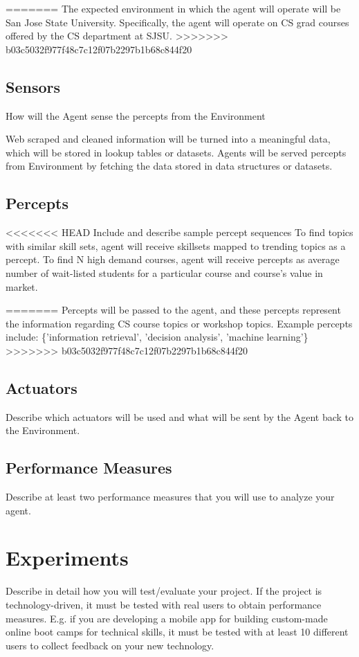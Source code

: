 \documentclass{article}
\begin{document}
=======
The expected environment in which the agent will operate will be San Jose State University. Specifically, the agent will operate on CS grad courses offered by the CS department at SJSU. 
>>>>>>> b03c5032f977f48c7c12f07b2297b1b68c844f20
\subsection{Sensors}
How will the Agent sense the percepts from the Environment

Web scraped and cleaned information will be turned into a meaningful data, which will be stored in lookup tables or datasets.
Agents will be served percepts from Environment by fetching the data stored in data structures or datasets. 


\subsection{Percepts}
<<<<<<< HEAD
Include and describe sample percept sequences
To find topics with similar skill sets, agent will receive skillsets mapped to trending topics as a percept.
To find N high demand courses, agent will receive percepts as average number of wait-listed students for a particular course and course's value in market.

=======
Percepts will be passed to the agent, and these percepts represent the information regarding CS course topics or workshop topics. Example percepts include: 
\{'information retrieval', 'decision analysis', 'machine learning'\}
>>>>>>> b03c5032f977f48c7c12f07b2297b1b68c844f20
\subsection{Actuators}
Describe which actuators will be used and what will be sent by the Agent back to the Environment.
\subsection{Performance Measures}
Describe at least two performance measures that you will use to analyze your agent.

\section{Experiments}
Describe in detail how you will test/evaluate your project.
If the project is technology-driven, it must be tested with real users to obtain performance measures.  E.g. if you are developing a mobile app for building custom-made online boot camps for technical skills, it must be tested with at least 10 different users to collect feedback on your new technology.
\end{document}
